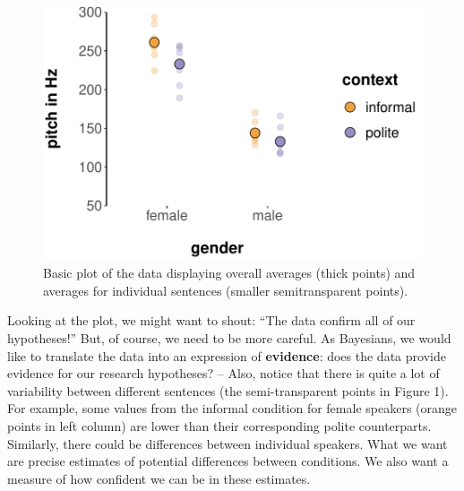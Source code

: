 \documentclass[nobib]{tufte-handout}
\begin{document}
\begin{figure}[t]
  \centering
    \includegraphics[width = \textwidth]{pics/basic_data_plot.pdf}
    \caption{Basic plot of the data displaying overall averages (thick points) and averages for individual sentences (smaller semitransparent points).}
     \label{fig:BasicPlotData_data}
\end{figure}


Looking at the plot, we might want to shout: ``The data confirm all of our hypotheses!'' But,
of course, we need to be more careful. As Bayesians, we would like to translate the data into
an expression of \textbf{evidence}: does the data provide evidence for our research hypotheses?
-- Also, notice that there is quite a lot of variability between different sentences (the
semi-transparent points in Figure 1). For example, some values from the informal condition for
female speakers (orange points in left column) are lower than their corresponding polite
counterparts. Similarly, there could be differences between individual speakers. What we want
are precise estimates of potential differences between conditions. We also want a measure of
how confident we can be in these estimates.
\end{document}
